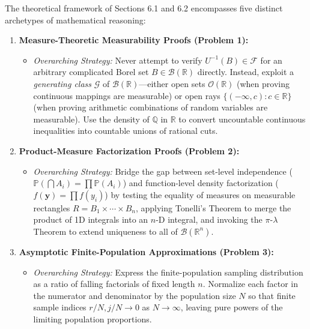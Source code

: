 \documentclass[11pt, letterpaper]{article}
\theoremstyle{definition}
\theoremstyle{remark}
\newcommand{\R}{\mathbb{R}}
\newcommand{\Q}{\mathbb{Q}}
\newcommand{\Prob}{\mathbb{P}}
\newcommand{\F}{\mathcal{F}}
\begin{document}
The theoretical framework of Sections 6.1 and 6.2 encompasses five distinct archetypes of mathematical reasoning:

\begin{enumerate}[label=\textbf{\arabic*.}]
    \item \textbf{Measure-Theoretic Measurability Proofs (Problem 1):}
    \begin{itemize}
        \item \emph{Overarching Strategy:} Never attempt to verify $U^{-1}(B) \in \F$ for an arbitrary complicated Borel set $B \in \mathcal{B}(\R)$ directly. Instead, exploit a \emph{generating class} $\mathcal{G}$ of $\mathcal{B}(\R)$—either open sets $\mathcal{O}(\R)$ (when proving continuous mappings are measurable) or open rays $\{(-\infty, c) : c \in \R\}$ (when proving arithmetic combinations of random variables are measurable). Use the density of $\Q$ in $\R$ to convert uncountable continuous inequalities into countable unions of rational cuts.
    \end{itemize}

    \item \textbf{Product-Measure Factorization Proofs (Problem 2):}
    \begin{itemize}
        \item \emph{Overarching Strategy:} Bridge the gap between set-level independence ($\Prob(\bigcap A_i) = \prod \Prob(A_i)$) and function-level density factorization ($f(\mathbf{y}) = \prod f(y_i)$) by testing the equality of measures on measurable rectangles $R = B_1 \times \cdots \times B_n$, applying Tonelli's Theorem to merge the product of 1D integrals into an $n$-D integral, and invoking the $\pi$-$\lambda$ Theorem to extend uniqueness to all of $\mathcal{B}(\R^n)$.
    \end{itemize}

    \item \textbf{Asymptotic Finite-Population Approximations (Problem 3):}
    \begin{itemize}
        \item \emph{Overarching Strategy:} Express the finite-population sampling distribution as a ratio of falling factorials of fixed length $n$. Normalize each factor in the numerator and denominator by the population size $N$ so that finite sample indices $r/N, j/N \to 0$ as $N \to \infty$, leaving pure powers of the limiting population proportions.
    \end{itemize}


\end{enumerate}
\end{document}
